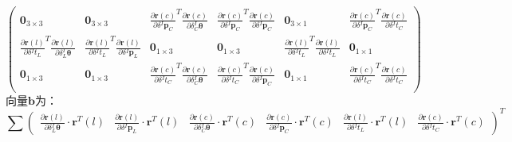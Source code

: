 \begin{equation}
\begin{pmatrix}
    \boldsymbol{0}_{3\times 3}                                                       &
    \boldsymbol{0}_{3\times 3}                                                       &
    \frac{\partial \boldsymbol{r}(c)}{\partial \delta {^{I}\boldsymbol{p}_C}}^T
    \frac{\partial \boldsymbol{r}(c)}{\partial \delta {^{I}_{C}\boldsymbol{\theta}}} &
    \frac{\partial \boldsymbol{r}(c)}{\partial \delta {^{I}\boldsymbol{p}_C}}^T
    \frac{\partial \boldsymbol{r}(c)}{\partial \delta {^{I}\boldsymbol{p}_C}}        &
    \boldsymbol{0}_{3\times 1}                                                       &
    \frac{\partial \boldsymbol{r}(c)}{\partial \delta {^{I}\boldsymbol{p}_C}}^T
    \frac{\partial \boldsymbol{r}(c)}{\partial \delta {^{I}t_{C}}}                     \\
    \frac{\partial \boldsymbol{r}(l)}{\partial \delta {^{I}t_{L}}}^T
    \frac{\partial \boldsymbol{r}(l)}{\partial \delta {^{I}_{L}\boldsymbol{\theta}}} &
    \frac{\partial \boldsymbol{r}(l)}{\partial \delta {^{I}t_{L}}}^T
    \frac{\partial \boldsymbol{r}(l)}{\partial \delta {^{I}\boldsymbol{p}_L}}        &
    \boldsymbol{0}_{1\times 3}                                                       &
    \boldsymbol{0}_{1\times 3}                                                       &
    \frac{\partial \boldsymbol{r}(l)}{\partial \delta {^{I}t_{L}}}^T
    \frac{\partial \boldsymbol{r}(l)}{\partial \delta {^{I}t_{L}}}                   &
    \boldsymbol{0}_{1\times 1}                                                         \\
    \boldsymbol{0}_{1\times 3}                                                       &
    \boldsymbol{0}_{1\times 3}                                                       &
    \frac{\partial \boldsymbol{r}(c)}{\partial \delta {^{I}t_{C}}}^T
    \frac{\partial \boldsymbol{r}(c)}{\partial \delta {^{I}_{C}\boldsymbol{\theta}}} &
    \frac{\partial \boldsymbol{r}(c)}{\partial \delta {^{I}t_{C}}}^T
    \frac{\partial \boldsymbol{r}(c)}{\partial \delta {^{I}\boldsymbol{p}_C}}        &
    \boldsymbol{0}_{1\times 1}                                                       &
    \frac{\partial \boldsymbol{r}(c)}{\partial \delta {^{I}t_{C}}}^T
    \frac{\partial \boldsymbol{r}(c)}{\partial \delta {^{I}t_{C}}}                     \\
  \end{pmatrix}
\end{equation}
向量$\boldsymbol{b}$为：
\begin{equation}
  \sum\begin{pmatrix}
    \frac{\partial \boldsymbol{r}(l)}{\partial \delta {^{I}_{L}\boldsymbol{\theta}}}\cdot\boldsymbol{r}^T(l) &
    \frac{\partial \boldsymbol{r}(l)}{\partial \delta {^{I}\boldsymbol{p}_L}}\cdot\boldsymbol{r}^T(l)        &
    \frac{\partial \boldsymbol{r}(c)}{\partial \delta {^{I}_{C}\boldsymbol{\theta}}}\cdot\boldsymbol{r}^T(c) &
    \frac{\partial \boldsymbol{r}(c)}{\partial \delta {^{I}\boldsymbol{p}_C}}\cdot\boldsymbol{r}^T(c)        &
    \frac{\partial \boldsymbol{r}(l)}{\partial \delta {^{I}t_{L}}}\cdot\boldsymbol{r}^T(l)                   &
    \frac{\partial \boldsymbol{r}(c)}{\partial \delta {^{I}t_{C}}}\cdot\boldsymbol{r}^T(c)
  \end{pmatrix}^T
\end{equation}
